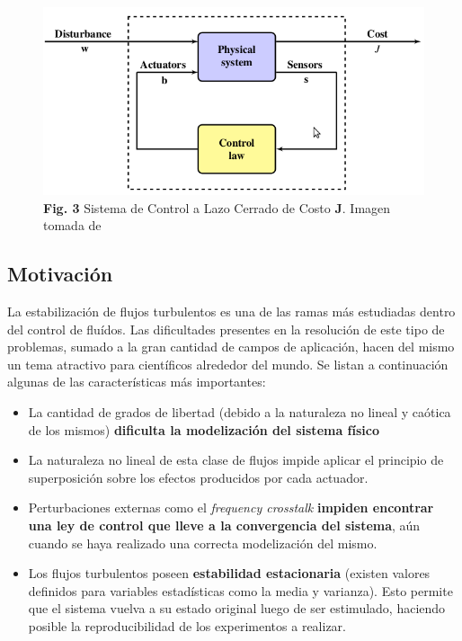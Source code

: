 \documentclass[a4paper,10pt]{article}
\begin{document}
        \begin{figure}[!Hhtb]
            \centering
            \includegraphics[width=12cm,origin=c]{Imagenes/control_loop.png}
            \caption{\textbf{Fig. 3} Sistema de Control a Lazo Cerrado de Costo \textbf{J}.
            Imagen tomada de \cite{Duriez2016}} \label{fig003}
        \end{figure}

        \subsection{Motivación} \label{sec:motiv}
        La estabilización de flujos turbulentos es una de las ramas más estudiadas dentro del control de fluídos. Las
        dificultades presentes en la resolución de este tipo de problemas, sumado a la gran cantidad de campos de aplicación, hacen del
        mismo un tema atractivo para científicos alrededor del mundo. Se listan a continuación algunas de las características más
        importantes:

        \begin{itemize}
            \item La cantidad de grados de libertad (debido a la naturaleza no lineal y caótica de los mismos) \textbf{dificulta la
            modelización del sistema físico}
            \item La naturaleza no lineal de esta clase de flujos impide aplicar el principio de superposición sobre los efectos producidos
            por cada actuador.
            \item Perturbaciones externas como el \textit{frequency crosstalk} \textbf{impiden encontrar una ley de control que lleve a la
            convergencia del sistema}, aún cuando se haya realizado una correcta modelización del mismo.
            \item Los flujos turbulentos poseen \textbf{estabilidad estacionaria} (existen valores definidos para variables estadísticas
            como la media y varianza). Esto permite que el sistema vuelva a su estado original luego de ser estimulado, haciendo posible
            la reproducibilidad de los experimentos a realizar.
        \end{itemize}
\end{document}
